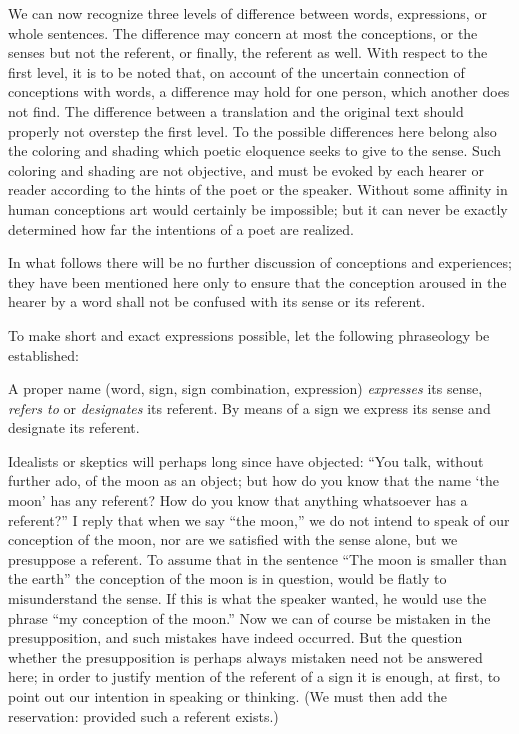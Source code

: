 \documentclass[twoside,12pt,a4paper]{article}
\begin{document}
We can now recognize three levels of difference between words,
expressions, or whole sentences. The difference may concern at most
the conceptions, or the senses but not the referent, or finally, the
referent as well. With respect to the first level, it is to be noted
that, on account of the uncertain connection of conceptions with
words, a difference may hold for one person, which another does not
find. The difference between a translation and the original text
should properly not overstep the first level. To the possible
differences here belong also the coloring and shading which poetic
eloquence seeks to give to the sense. Such coloring and shading are
not objective, and must be evoked by each hearer or reader according
to the hints of the poet or the speaker. Without some affinity in
human conceptions art would certainly be impossible; but it can never
be exactly determined how far the intentions of a poet are realized.

In what follows there will be no further discussion of conceptions and
experiences; they have been mentioned here only to ensure that the
conception aroused in the hearer by a word shall not be confused with
its sense or its referent.

To make short and exact expressions possible, let the following
phraseology be established:

A proper name (word, sign, sign combination, expression)
\emph{expresses} its sense, \emph{refers to} or \emph{designates} its
referent. By means of a sign we express its sense and designate its
referent.

Idealists or skeptics will perhaps long since have objected: ``You
talk, without further ado, of the moon as an object; but how do you
know that the name `the moon' has any referent? How do you know that
anything whatsoever has a referent?'' I reply that when we say ``the
moon,'' we do not intend to speak of our conception of the moon, nor
are we satisfied with the sense alone, but we presuppose a referent.
To assume that in the sentence ``The moon is smaller than the earth''
the conception of the moon is in question, would be flatly to
misunderstand the sense. If this is what the speaker wanted, he would
use the phrase ``my conception of the moon.'' Now we can of course be
mistaken in the presupposition, and such mistakes have indeed
occurred. But the question whether the presupposition is perhaps
always mistaken need not be answered here; in order to justify mention
of the referent of a sign it is enough, at first, to point out our
intention in speaking or thinking. (We must then add the reservation:
provided such a referent exists.)
\end{document}

